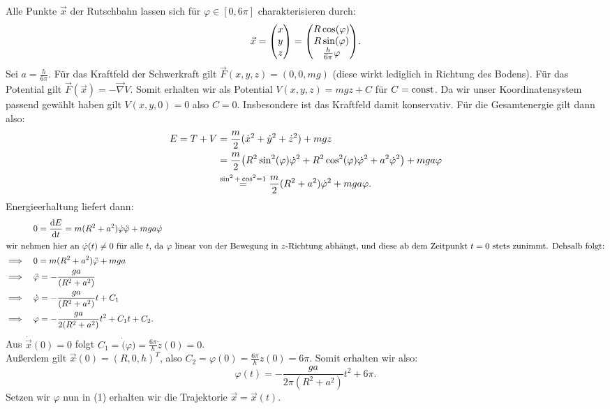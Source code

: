 \documentclass{theozettel}
\renewcommand{\phi}{\varphi}
\begin{document}
	
Alle Punkte $\vec{x}$ der Rutschbahn lassen sich für $\phi \in [0,6\pi]$ charakterisieren durch:
	\begin{equation}
		\vec{x} = \mqty(x \\ y \\ z) = \mqty(R\cos(\phi) \\ R\sin(\phi) \\ \frac{h}{6\pi}\phi).
	\end{equation}
Sei $a=\frac{h}{6\pi}$. Für das Kraftfeld der Schwerkraft gilt $\vec{F}(x,y,z) = (0,0,mg)$ (diese wirkt lediglich in Richtung des Bodens). Für das Potential gilt $\vec{F}(\vec{x}) = -\vec{\nabla}V$. Somit erhalten wir als Potential $V(x,y,z) = mgz + C$ für $C = \operatorname{const}$. Da wir unser Koordinatensystem passend gewählt haben gilt $V(x,y,0) = 0$ also $C=0$. Insbesondere ist das Kraftfeld damit konservativ. Für die Gesamtenergie gilt dann also:
	\begin{align*}
		E = T + V &= \frac{m}{2}(\dot{x}^{2} + \dot{y}^{2} + \dot{z}^{2}) + mgz \\
		&= \frac{m}{2}\qty(R^{2}\sin^{2}(\phi)\dot{\phi}^{2} + R^{2}\cos^{2}(\phi)\dot{\phi}^{2} + a^{2}\dot{\phi}^{2}) + mga\phi \\
		&\stackrel{\sin^{2}+\cos^{2}=1}{=} \frac{m}{2}(R^{2}+a^{2})\dot{\phi}^{2} + mga \phi.
	\end{align*}
Energieerhaltung liefert dann:
	\begin{align*}
		& 0 = \dv{E}{t} = m(R^{2}+a^{2})\dot{\phi}\ddot{\phi} + mga\dot{\phi}\\
	\intertext{wir nehmen hier an $\dot{\phi}(t) \neq 0$ für alle $t$, da $\phi$ linear von der Bewegung in $z$-Richtung abhängt, und diese ab dem Zeitpunkt $t=0$ stets zunimmt. Dehsalb folgt:}
		\implies \ \ \ & 0 = m(R^{2}+a^{2})\ddot{\phi} + mga \\
		\implies \ \ \ & \ddot{\phi} = -\frac{ga}{(R^{2}+a^{2})} \\
		\implies \ \ \ & \dot{\phi} = -\frac{ga}{(R^{2}+a^{2})}t + C_{1} \\
		\implies \ \ \ & \phi = -\frac{ga}{2(R^{2}+a^{2})}t^{2} + C_{1}t + C_{2}.
	\end{align*}
Aus $\dot{\vec{x}}(0) = 0$ folgt $C_{1} = \dot(\phi) = \frac{6\pi}{h}\dot{z}(0) = 0$.\\ Außerdem gilt $\vec{x}(0) = (R,0,h)^{T}$, also $C_{2} = \phi(0) = \frac{6\pi}{h}z(0) = 6\pi$. Somit erhalten wir also:
	\[
		\phi(t) = -\frac{ga}{2\pi(R^{2}+a^{2})}t^{2} + 6\pi.
	\]
Setzen wir $\phi$ nun in (1) erhalten wir die Trajektorie $\vec{x} = \vec{x}(t)$. 
\end{document}
